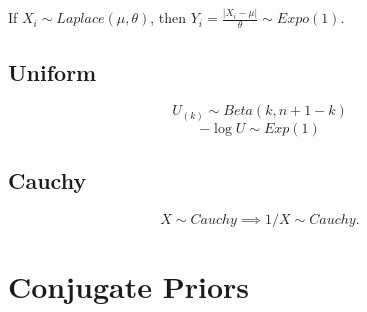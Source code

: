 \documentclass{article}
\begin{document}
If $X_i \sim Laplace(\mu, \theta)$, then $Y_i = \frac{|X_i - \mu|}{\theta} \sim Expo(1)$. 

\subsection{Uniform}
$$U_{(k)} \sim Beta(k, n+1-k)$$
$$-\log U \sim Exp(1)$$

\subsection{Cauchy}
$$X \sim Cauchy \implies 1/X \sim Cauchy.$$
\section{Conjugate Priors}
\end{document}
